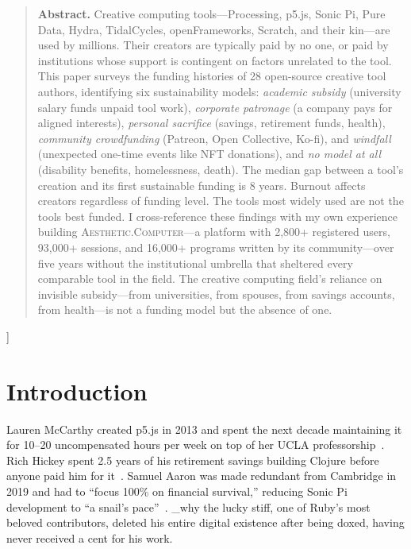 \documentclass[10pt,letterpaper,twocolumn]{article}
\newcommand{\ac}{\textsc{Aesthetic.Computer}}
\begin{document}
{\begin{quote}
\small\noindent\textbf{Abstract.}
Creative computing tools---Processing, p5.js, Sonic Pi, Pure Data, Hydra, TidalCycles, openFrameworks, Scratch, and their kin---are used by millions. Their creators are typically paid by no one, or paid by institutions whose support is contingent on factors unrelated to the tool. This paper surveys the funding histories of 28 open-source creative tool authors, identifying six sustainability models: \emph{academic subsidy} (university salary funds unpaid tool work), \emph{corporate patronage} (a company pays for aligned interests), \emph{personal sacrifice} (savings, retirement funds, health), \emph{community crowdfunding} (Patreon, Open Collective, Ko-fi), and \emph{windfall} (unexpected one-time events like NFT donations), and \emph{no model at all} (disability benefits, homelessness, death). The median gap between a tool's creation and its first sustainable funding is 8 years. Burnout affects creators regardless of funding level. The tools most widely used are not the tools best funded. I cross-reference these findings with my own experience building \ac{}---a platform with 2,800+ registered users, 93,000+ sessions, and 16,000+ programs written by its community---over five years without the institutional umbrella that sheltered every comparable tool in the field. The creative computing field's reliance on invisible subsidy---from universities, from spouses, from savings accounts, from health---is not a funding model but the absence of one.
\end{quote}
\vspace{0.5em}
}]

\section{Introduction}

Lauren McCarthy created p5.js in 2013 and spent the next decade maintaining it for 10--20 uncompensated hours per week on top of her UCLA professorship~\citep{mccarthy2023making}. Rich Hickey spent 2.5 years of his retirement savings building Clojure before anyone paid him for it~\citep{hickey2020history}. Samuel Aaron was made redundant from Cambridge in 2019 and had to ``focus 100\% on financial survival,'' reducing Sonic Pi development to ``a snail's pace''~\citep{aaron2016sonic}. \_why the lucky stiff, one of Ruby's most beloved contributors, deleted his entire digital existence after being doxed, having never received a cent for his work.
\end{document}
